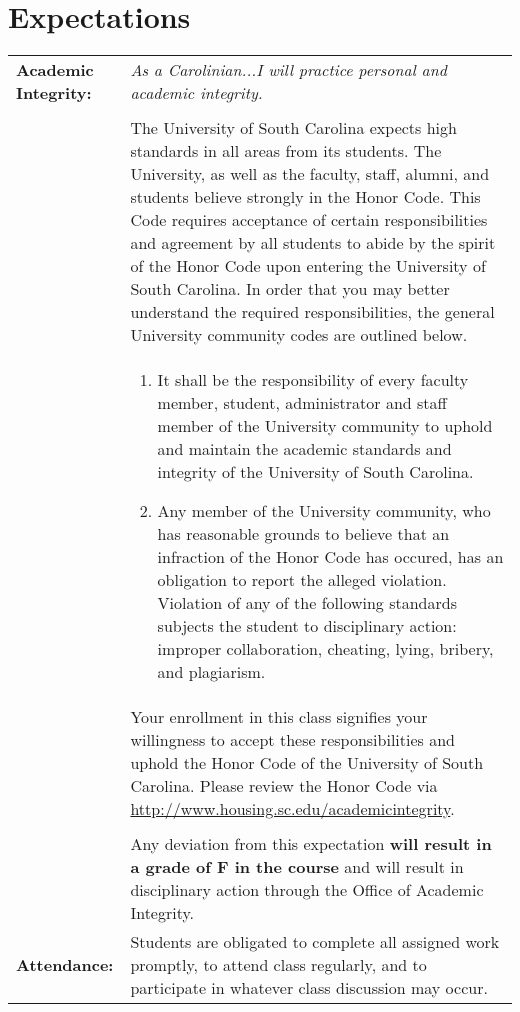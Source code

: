 \documentclass[10pt]{amsart}
\begin{document}
\section*{Expectations}
\noindent
\begin{tabular}{p{1.4in}p{5in}}
  {\bf Academic Integrity:} & 
  {\it As a Carolinian...I will practice personal and academic integrity.}\\\\

  &The University of South Carolina expects high standards in all areas from its students.
    The University, as well as the faculty, staff, alumni, and students believe strongly in the Honor Code.
    This Code requires acceptance of certain responsibilities and agreement by all students to abide by the spirit of the Honor Code upon entering the University of South Carolina.
    In order that you may better understand the required responsibilities, the general University community codes are outlined below.\\
    &
    \begin{enumerate}
    \item
      It shall be the responsibility of every faculty member, student, administrator and staff member of the University community to uphold and maintain the academic standards and integrity of the University of South Carolina.
    \item
      Any member of the University community, who has reasonable grounds to believe that an infraction of the Honor Code has occured, has an obligation to report the alleged violation.
      Violation of any of the following standards subjects the student to disciplinary action: improper collaboration, cheating, lying, bribery, and plagiarism.
    \end{enumerate}
    \\
    & Your enrollment in this class signifies your willingness to accept these responsibilities and uphold the Honor Code of the University of South Carolina.
    Please review the Honor Code via \url{http://www.housing.sc.edu/academicintegrity}.\\\\

    & Any deviation from this expectation {\bf will result in a grade of F in the course} and will result in disciplinary action through the Office of Academic Integrity.\\
  {\bf Attendance:} & Students are obligated to complete all assigned work promptly, to attend class regularly, and to participate in whatever class discussion may occur.


\end{tabular}
\end{document}
